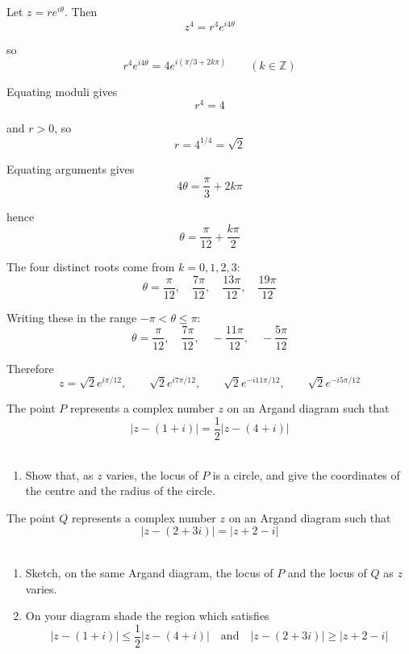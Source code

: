 \documentclass[leqno]{article}
\begin{document}
\begin{enumerate}[
  label=\textbf{\arabic*.},
  leftmargin=*,
  topsep=0pt,
  partopsep=0pt,
  parsep=0pt
]
\begin{djsSolution}
\begin{enumerate}[label=\textbf{(\alph*)}]
  Let \(z=re^{i\theta}\). Then
  \[
  z^4=r^4e^{i4\theta}
  \]

  so
  \[
  r^4e^{i4\theta}=4e^{i(\pi/3+2k\pi)}
  \qquad (k\in\mathbb{Z})
  \]

  Equating moduli gives
  \[
  r^4=4
  \]

  and \(r>0\), so
  \[
  r=4^{1/4}=\sqrt{2}
  \]

  Equating arguments gives
  \[
  4\theta=\frac{\pi}{3}+2k\pi
  \]

  hence
  \[
  \theta=\frac{\pi}{12}+\frac{k\pi}{2}
  \]

  The four distinct roots come from \(k=0,1,2,3\):
  \[
  \theta=\frac{\pi}{12},\quad \frac{7\pi}{12},\quad \frac{13\pi}{12},\quad \frac{19\pi}{12}
  \]

  Writing these in the range \(-\pi<\theta\leq\pi\):
  \[
  \theta=\frac{\pi}{12},\quad \frac{7\pi}{12},\quad -\frac{11\pi}{12},\quad -\frac{5\pi}{12}
  \]

  Therefore
  \[
  z=\sqrt{2}e^{i\pi/12},\qquad
  \sqrt{2}e^{i7\pi/12},\qquad
  \sqrt{2}e^{-i11\pi/12},\qquad
  \sqrt{2}e^{-i5\pi/12}
  \]
\end{enumerate}
\end{djsSolution}


\newpage

\questionitem

The point $P$ represents a complex number $z$ on an Argand diagram such that
\[
|z-(1+i)|=\frac{1}{2}|z-(4+i)|
\] \\

\begin{enumerate}[label=\textbf{(\alph*)}]
  \item Show that, as $z$ varies, the locus of $P$ is a circle, and give the coordinates of the centre and the radius of the circle.  \\
\end{enumerate}

The point $Q$ represents a complex number $z$ on an Argand diagram such that
\[
|z-(2+3i)|=|z+2-i|
\] \\

\begin{enumerate}[label=\textbf{(\alph*)}, resume]
  \item Sketch, on the same Argand diagram, the locus of $P$ and the locus of $Q$ as $z$ varies.  \\
  \item On your diagram shade the region which satisfies
  \[
  |z-(1+i)|\le \frac{1}{2}|z-(4+i)| \quad \text{and} \quad |z-(2+3i)|\ge |z+2-i|
  \]
\end{enumerate}


\end{enumerate}
\end{document}
